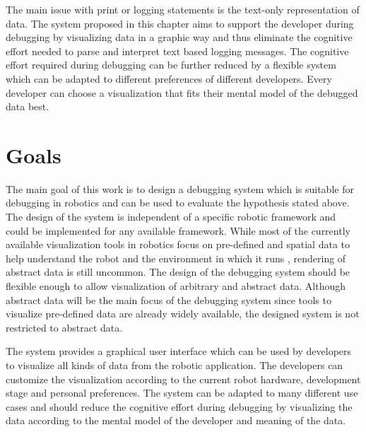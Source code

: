 The main issue with print or logging statements is the text-only representation of data. The system proposed in this chapter aims to support the developer during debugging by visualizing data in a graphic way and thus eliminate the cognitive effort needed to parse and interpret text based logging messages. The cognitive effort required during debugging can be further reduced by a flexible system which can be adapted to different preferences of different developers. Every developer can choose a visualization that fits their mental model of the debugged data best.


\section{Goals}
The main goal of this work is to design a debugging system which is suitable for debugging in robotics and can be used to evaluate the hypothesis stated above. The design of the system is independent of a specific robotic framework and could be implemented for any available framework.
While most of the currently available visualization tools in robotics focus on pre-defined and spatial data to help understand the robot and the environment in which it runs \cite{Collett2010, Quigley2009}, rendering of abstract data is still uncommon. The design of the debugging system should be flexible enough to allow visualization of arbitrary and abstract data. Although abstract data will be the main focus of the debugging system since tools to visualize pre-defined data are already widely available, the designed system is not restricted to abstract data.

The system provides a graphical user interface which can be used by developers to visualize all kinds of data from the robotic application. The developers can customize the visualization according to the current robot hardware, development stage and personal preferences. The system can be adapted to many different use cases and should reduce the cognitive effort during debugging by visualizing the data according to the mental model of the developer and meaning of the data.


